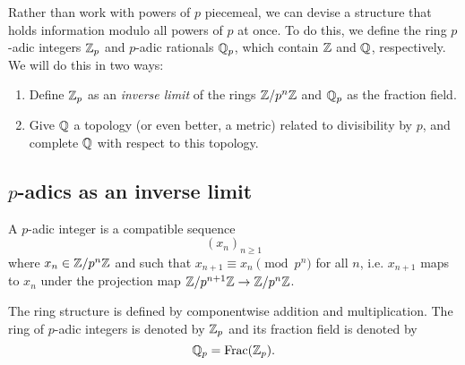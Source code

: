 Rather than work with powers of $p$ piecemeal, we can devise a structure that holds information modulo all powers of $p$ at once. To do this, we define the ring $p$-adic integers $\mathbb{Z}_p$ and $p$-adic rationals $\mathbb{Q}_p$, which contain $\mathbb{Z}$ and $\mathbb{Q}$, respectively. We will do this in two ways:
\begin{enumerate}
\item Define $\mathbb{Z}_p$ as an {\it inverse limit} of the rings $\mathbb{Z}/p^n\mathbb{Z}$ and $\mathbb{Q}_p$ as the fraction field.
\item Give $\mathbb{Q}$ a topology (or even better, a metric) related to divisibility by $p$, and complete $\mathbb{Q}$ with respect to this topology.
\end{enumerate}
\subsection{$p$-adics as an inverse limit}
\begin{df}
A $p$-adic integer is a compatible sequence
\[
(x_n)_{n\ge 1}
\]
where $x_n\in \mathbb{Z}/p^n\mathbb{Z}$ and such that $x_{n+1}\equiv x_n\pmod{p^n}$ for all $n$, i.e. $x_{n+1}$ maps to $x_n$ under the projection map $\mathbb{Z}/p^{n+1}\mathbb{Z}\to \mathbb{Z}/p^n\mathbb{Z}$.

The ring structure is defined by componentwise addition and multiplication. The ring of $p$-adic integers is denoted by $\mathbb{Z}_p$ and its fraction field is denoted by
\[
\mathbb{Q}_p=\operatorname{Frac}(\mathbb{Z}_p).
\]
\end{df}
%
